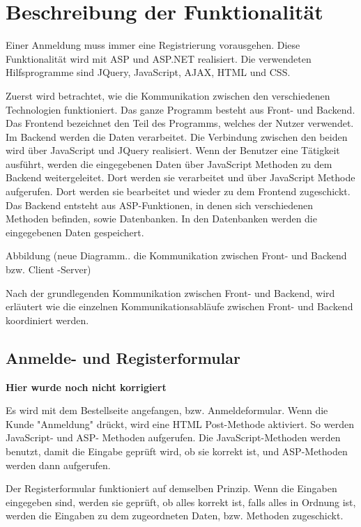 \section{Beschreibung der Funktionalität}   

Einer Anmeldung muss immer eine Registrierung vorausgehen. Diese Funktionalität wird mit ASP und ASP.NET realisiert. Die verwendeten Hilfsprogramme sind JQuery, JavaScript, AJAX, HTML und CSS. 

Zuerst wird betrachtet, wie die Kommunikation zwischen den verschiedenen Technologien funktioniert. Das ganze Programm besteht aus Front- und Backend. Das Frontend bezeichnet den Teil des Programms, welches der Nutzer verwendet. Im Backend werden die Daten verarbeitet. Die Verbindung zwischen den beiden wird über JavaScript und JQuery realisiert. Wenn der Benutzer eine Tätigkeit ausführt, werden die eingegebenen Daten über JavaScript Methoden zu dem Backend weitergeleitet. Dort werden sie verarbeitet und über JavaScript Methode aufgerufen. Dort werden sie bearbeitet und wieder zu dem Frontend zugeschickt. Das Backend entsteht aus ASP-Funktionen, in denen sich verschiedenen Methoden befinden, sowie Datenbanken. In den Datenbanken werden die eingegebenen Daten gespeichert.

Abbildung (neue Diagramm.. die Kommunikation zwischen Front- und Backend bzw. Client -Server)

Nach der grundlegenden Kommunikation zwischen Front- und Backend, wird erläutert wie die einzelnen Kommunikationsabläufe zwischen Front- und Backend koordiniert werden.

\subsection{Anmelde- und Registerformular} 

\textbf{Hier wurde noch nicht korrigiert}

Es wird mit dem Bestellseite angefangen, bzw. Anmeldeformular. Wenn die Kunde "Anmeldung" drückt, wird eine HTML Post-Methode aktiviert.  So werden JavaScript- und ASP- Methoden aufgerufen. Die JavaScript-Methoden werden benutzt, damit die Eingabe geprüft wird, ob sie korrekt ist, und ASP-Methoden werden dann aufgerufen. 

Der Registerformular funktioniert auf demselben Prinzip. Wenn die Eingaben eingegeben sind, werden sie geprüft, ob alles korrekt ist, falls alles in Ordnung ist, werden die Eingaben zu dem zugeordneten Daten, bzw. Methoden zugeschickt.

